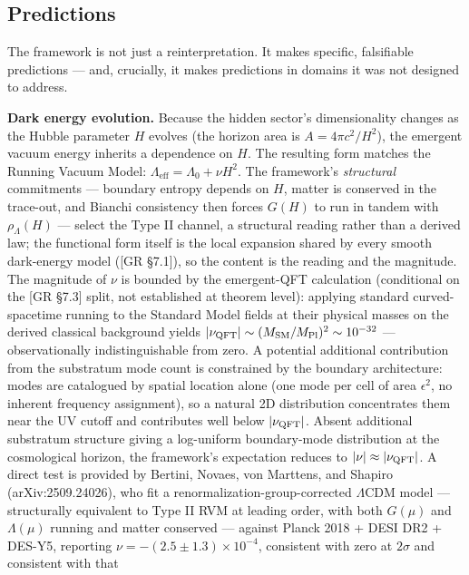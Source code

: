 \documentclass[
]{article}
\begin{document}
\hypertarget{predictions}{%
\subsection{Predictions}\label{predictions}}

The framework is not just a reinterpretation. It makes specific,
falsifiable predictions --- and, crucially, it makes predictions in
domains it was not designed to address.

\textbf{Dark energy evolution.} Because the hidden sector's
dimensionality changes as the Hubble parameter \(H\) evolves (the
horizon area is \(A = 4\pi c^2/H^2\)), the emergent vacuum energy
inherits a dependence on \(H\). The resulting form matches the Running
Vacuum Model: \(\Lambda_{\text{eff}} = \Lambda_0 + \nu H^2\). The
framework's \emph{structural} commitments --- boundary entropy depends
on \(H\), matter is conserved in the trace-out, and Bianchi consistency
then forces \(G(H)\) to run in tandem with \(\rho_\Lambda(H)\) ---
select the Type II channel, a structural reading rather than a derived
law; the functional form itself is the local expansion shared by every
smooth dark-energy model ({[}GR §7.1{]}), so the content is the reading
and the magnitude. The magnitude of \(\nu\) is bounded by the
emergent-QFT calculation (conditional on the {[}GR §7.3{]} split, not
established at theorem level): applying standard curved-spacetime
running to the Standard Model fields at their physical masses on the
derived classical background yields
\(|\nu_{\rm QFT}| \sim (M_{\rm SM}/M_{\rm Pl})^2 \sim 10^{-32}\) ---
observationally indistinguishable from zero. A potential additional
contribution from the substratum mode count is constrained by the
boundary architecture: modes are catalogued by spatial location alone
(one mode per cell of area \(\epsilon^2\), no inherent frequency
assignment), so a natural 2D distribution concentrates them near the UV
cutoff and contributes well below \(|\nu_{\rm QFT}|\). Absent additional
substratum structure giving a log-uniform boundary-mode distribution at
the cosmological horizon, the framework's expectation reduces to
\(|\nu| \approx |\nu_{\rm QFT}|\). A direct test is provided by Bertini,
Novaes, von Marttens, and Shapiro (arXiv:2509.24026), who fit a
renormalization-group-corrected \(\Lambda\)CDM model --- structurally
equivalent to Type II RVM at leading order, with both \(G(\mu)\) and
\(\Lambda(\mu)\) running and matter conserved --- against Planck 2018 +
DESI DR2 + DES-Y5, reporting \(\nu = -(2.5 \pm 1.3) \times 10^{-4}\),
consistent with zero at \(2\sigma\) and consistent with that
\end{document}

